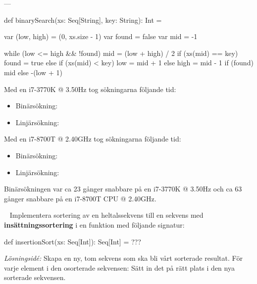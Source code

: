\SOLUTION


\TaskSolved \what


\SubtaskSolved ---

\SubtaskSolved
\begin{Code}
def binarySearch(xs: Seq[String], key: String): Int = {

  var (low, high) = (0, xs.size - 1)
  var found = false
  var mid = -1

  while (low <= high && !found) {
    mid = (low + high) / 2
    if (xs(mid) == key) found = true
    else if (xs(mid) < key) low = mid + 1
    else high = mid - 1
  }
  if (found)
    mid
  else
    -(low + 1)
}
\end{Code}

\SubtaskSolved
Med en i7-3770K @ 3.50Hz tog sökningarna följande tid:

\begin{itemize}
\item Binärsökning: 
\item Linjärsökning: 
\end{itemize}

Med en i7-8700T @ 2.40GHz tog sökningarna följande tid:
\begin{itemize}
\item Binärsökning: 
\item Linjärsökning: 
\end{itemize}




\SubtaskSolved
Binärsökningen var ca 23 gånger snabbare på en i7-3770K @ 3.50Hz och ca 63 gånger snabbare på en i7-8700T CPU @ 2.40GHz.



\QUESTEND






\QUESTBEGIN

\Task  \what~ Implementera sortering av en heltalssekvens till en  sekvens med \textbf{insättningssortering}  i en funktion med följande signatur:
\begin{Code}
def insertionSort(xs: Seq[Int]): Seq[Int] = ???
\end{Code}

\emph{Lösningsidé:} Skapa en ny, tom sekvens som ska bli vårt sorterade resultat. För varje element i den osorterade sekvensen: Sätt in det på rätt plats i den nya sorterade sekvensen.

